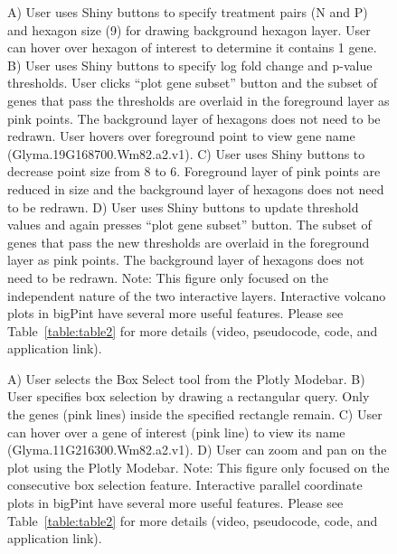 \documentclass[parskip=full]{bmcart} %
\begin{document}
\begin{backmatter}
\begin{figure}[h!]
\caption{
A) User uses Shiny buttons to specify treatment pairs (N and P) and hexagon size (9) for drawing background hexagon layer. User can hover over hexagon of interest to determine it contains 1 gene. B) User uses Shiny buttons to specify log fold change and p-value thresholds. User clicks “plot gene subset” button and the subset of genes that pass the thresholds are overlaid in the foreground layer as pink points. The background layer of hexagons does not need to be redrawn. User hovers over foreground point to view gene name (Glyma.19G168700.Wm82.a2.v1). C) User uses Shiny buttons to decrease point size from 8 to 6. Foreground layer of pink points are reduced in size and the background layer of hexagons does not need to be redrawn. D) User uses Shiny buttons to update threshold values and again presses “plot gene subset” button. The subset of genes that pass the new thresholds are overlaid in the foreground layer as pink points. The background layer of hexagons does not need to be redrawn. Note: This figure only focused on the independent nature of the two interactive layers. Interactive volcano plots in bigPint have several more useful features. Please see Table~\ref{table:table2} for more details (video, pseudocode, code, and application link).}
\label{figureVolcano}
\end{figure}

\begin{figure}[h!]
\caption{
A) User selects the Box Select tool from the Plotly Modebar. B) User specifies box selection by drawing a rectangular query. Only the genes (pink lines) inside the specified rectangle remain. C) User can hover over a gene of interest (pink line) to view its name (Glyma.11G216300.Wm82.a2.v1). D) User can zoom and pan on the plot using the Plotly Modebar. Note: This figure only focused on the consecutive box selection feature. Interactive parallel coordinate plots in bigPint have several more useful features. Please see Table~\ref{table:table2} for more details (video, pseudocode, code, and application link).}
\label{figurePCP}
\end{figure}



\end{backmatter}
\end{document}
